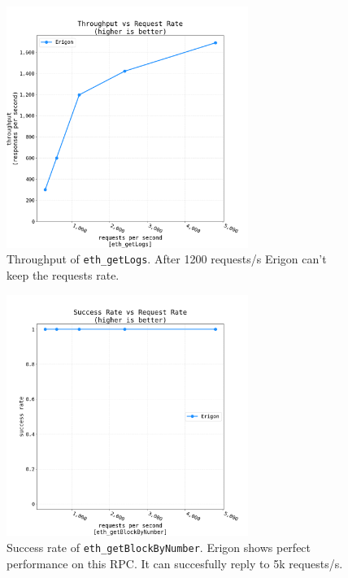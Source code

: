 \begin{figure}[H]
    \centering
    \includegraphics[width=0.7\textwidth]{Figures/results/load_tests/logs/throughput_logs.png}
    \caption{Throughput of {\tt eth\_getLogs}. After 1200 requests/s Erigon can't keep the requests rate. }
    \label{fig:logs-throughput}
\end{figure}

\begin{figure}[H]
    \centering
    \includegraphics[width=0.7\textwidth]{Figures/results/load_tests/blocks/success_rate_blocks.png}
    \caption{Success rate of {\tt eth\_getBlockByNumber}. Erigon shows perfect performance on this RPC. It can succesfully reply to 5k requests/s. }
    \label{fig:blocks-success}
\end{figure}

